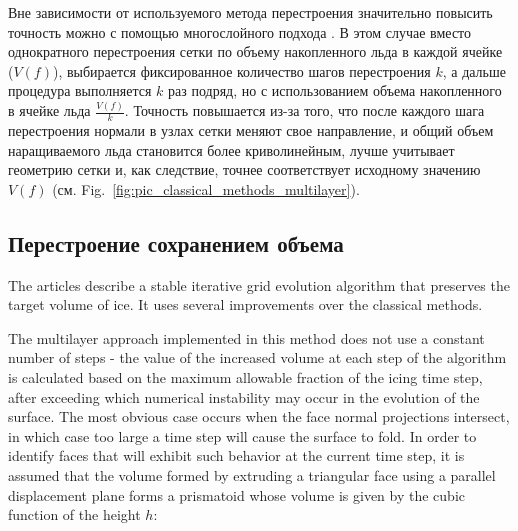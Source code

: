 \documentclass[
11pt,%
tightenlines,%
twoside,%
onecolumn,%
nofloats,%
nobibnotes,%
nofootinbib,%
superscriptaddress,%
noshowpacs,%
centertags]%
{revtex4}
\begin{document}
Вне зависимости от используемого метода перестроения значительно повысить точность можно с помощью многослойного подхода \cite{BourgaultCote}.
В этом случае вместо однократного перестроения сетки по объему накопленного льда в каждой ячейке ($V(f)$), выбирается фиксированное количество шагов перестроения $k$, а дальше процедура выполняется $k$ раз подряд, но с использованием объема накопленного в ячейке льда $\frac{V(f)}{k}$.
Точность повышается из-за того, что после каждого шага перестроения нормали в узлах сетки меняют свое направление, и общий объем наращиваемого льда становится более криволинейным, лучше учитывает геометрию сетки и, как следствие, точнее соответствует исходному значению $V(f)$ (см. Fig.~\ref{fig:pic_classical_methods_multilayer}).

\subsection{Перестроение сохранением объема}

The articles \cite{Thompson,Tong} describe a stable iterative grid evolution algorithm that preserves the target volume of ice.
It uses several improvements over the classical methods.

The multilayer approach implemented in this method does not use a constant number of steps - the value of the increased volume at each step of the algorithm is calculated based on the maximum allowable fraction of the icing time step, after exceeding which numerical instability may occur in the evolution of the surface.
The most obvious case occurs when the face normal projections intersect, in which case too large a time step will cause the surface to fold.
In order to identify faces that will exhibit such behavior at the current time step, it is assumed that the volume formed by extruding a triangular face using a parallel displacement plane forms a prismatoid whose volume is given by the cubic function of the height $h$:
\end{document}
